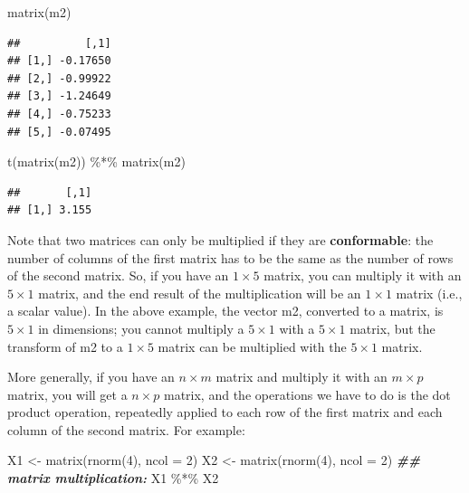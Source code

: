 \documentclass[
  12pt,
]{krantz}
\newenvironment{Shaded}{\begin{snugshade}}{\end{snugshade}}
\newcommand{\AttributeTok}[1]{\textcolor[rgb]{0.77,0.63,0.00}{#1}}
\newcommand{\DecValTok}[1]{\textcolor[rgb]{0.00,0.00,0.81}{#1}}
\newcommand{\DocumentationTok}[1]{\textcolor[rgb]{0.56,0.35,0.01}{\textbf{\textit{#1}}}}
\newcommand{\FunctionTok}[1]{\textcolor[rgb]{0.00,0.00,0.00}{#1}}
\newcommand{\NormalTok}[1]{#1}
\newcommand{\OtherTok}[1]{\textcolor[rgb]{0.56,0.35,0.01}{#1}}
\newcommand{\SpecialCharTok}[1]{\textcolor[rgb]{0.00,0.00,0.00}{#1}}
\theoremstyle{definition}
\theoremstyle{definition}
\theoremstyle{definition}
\theoremstyle{definition}
\theoremstyle{remark}
\begin{document}
\begin{Shaded}
\begin{Highlighting}[]
\FunctionTok{matrix}\NormalTok{(m2)}
\end{Highlighting}
\end{Shaded}

\begin{verbatim}
##          [,1]
## [1,] -0.17650
## [2,] -0.99922
## [3,] -1.24649
## [4,] -0.75233
## [5,] -0.07495
\end{verbatim}

\begin{Shaded}
\begin{Highlighting}[]
\FunctionTok{t}\NormalTok{(}\FunctionTok{matrix}\NormalTok{(m2)) }\SpecialCharTok{\%*\%} \FunctionTok{matrix}\NormalTok{(m2)}
\end{Highlighting}
\end{Shaded}

\begin{verbatim}
##       [,1]
## [1,] 3.155
\end{verbatim}

Note that two matrices can only be multiplied if they are \textbf{conformable}: the number of columns of the first matrix has to be the same as the number of rows of the second matrix. So, if you have an \(1\times 5\) matrix, you can multiply it with an \(5\times 1\) matrix, and the end result of the multiplication will be an \(1\times 1\) matrix (i.e., a scalar value). In the above example, the vector m2, converted to a matrix, is \(5\times 1\) in dimensions; you cannot multiply a \(5\times 1\) with a \(5\times 1\) matrix, but the transform of m2 to a \(1\times 5\) matrix can be multiplied with the \(5\times 1\) matrix.

More generally, if you have an \(n\times m\) matrix and multiply it with an \(m\times p\) matrix, you will get a \(n\times p\) matrix, and the operations we have to do is the dot product operation, repeatedly applied to each row of the first matrix and each column of the second matrix. For example:

\begin{Shaded}
\begin{Highlighting}[]
\NormalTok{X1 }\OtherTok{\textless{}{-}} \FunctionTok{matrix}\NormalTok{(}\FunctionTok{rnorm}\NormalTok{(}\DecValTok{4}\NormalTok{), }\AttributeTok{ncol =} \DecValTok{2}\NormalTok{)}
\NormalTok{X2 }\OtherTok{\textless{}{-}} \FunctionTok{matrix}\NormalTok{(}\FunctionTok{rnorm}\NormalTok{(}\DecValTok{4}\NormalTok{), }\AttributeTok{ncol =} \DecValTok{2}\NormalTok{)}
\DocumentationTok{\#\# matrix multiplication:}
\NormalTok{X1 }\SpecialCharTok{\%*\%}\NormalTok{ X2}
\end{Highlighting}
\end{Shaded}
\end{document}
